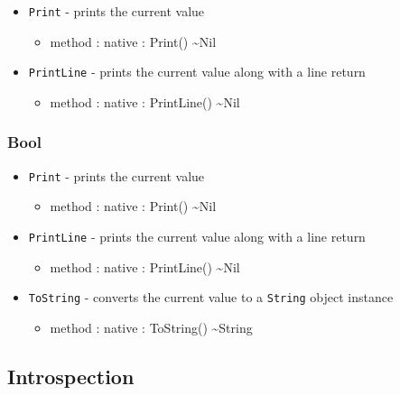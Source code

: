 \documentclass[12pt]{article}
\begin{document}
\begin{itemize}
\begin{itemize}
  \end{itemize}
\item \texttt{Print} - prints the current value
  \begin{itemize}
  \item method : native : Print() \textasciitilde Nil
  \end{itemize}
\item \texttt{PrintLine} - prints the current value along with a line
  return
  \begin{itemize}
  \item method : native : PrintLine() \textasciitilde Nil
  \end{itemize}
\end{itemize}

\subsubsection{Bool}
\begin{itemize}
\item \texttt{Print} - prints the current value
  \begin{itemize}
  \item method : native : Print() \textasciitilde Nil
  \end{itemize}
\item \texttt{PrintLine} - prints the current value along with a line
  return
  \begin{itemize}
  \item method : native : PrintLine() \textasciitilde Nil
  \end{itemize}
\item \texttt{ToString} - converts the current value to a
  \texttt{String} object instance
  \begin{itemize}
  \item method : native : ToString() \textasciitilde String
  \end{itemize}
\end{itemize}

\subsection{Introspection}
\end{document}
